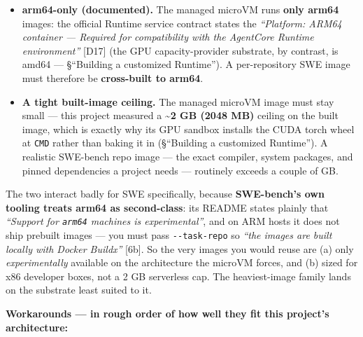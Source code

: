 \documentclass[
  paper=a4,
  ,captions=tableheading
]{scrartcl}
\providecommand{\tightlist}{%
  \setlength{\itemsep}{0pt}\setlength{\parskip}{0pt}}
\begin{document}
\begin{itemize}
\tightlist
\item
  \textbf{arm64-only (documented).} The managed microVM runs
  \textbf{only arm64} images: the official Runtime service contract
  states the \emph{``Platform: ARM64 container --- Required for
  compatibility with the AgentCore Runtime environment''} {[}D17{]} (the
  GPU capacity-provider substrate, by contrast, is amd64 --- §``Building
  a customized Runtime''). A per-repository SWE image must therefore be
  \textbf{cross-built to arm64}.
\item
  \textbf{A tight built-image ceiling.} The managed microVM image must
  stay small --- this project measured a \textbf{\textasciitilde2 GB
  (2048 MB)} ceiling on the built image, which is exactly why its GPU
  sandbox installs the CUDA torch wheel at \texttt{CMD} rather than
  baking it in (§``Building a customized Runtime''). A realistic
  SWE-bench repo image --- the exact compiler, system packages, and
  pinned dependencies a project needs --- routinely exceeds a couple of
  GB.
\end{itemize}

The two interact badly for SWE specifically, because \textbf{SWE-bench's
own tooling treats arm64 as second-class}: its README states plainly
that \emph{``Support for \texttt{arm64} machines is experimental''}, and
on ARM hosts it does not ship prebuilt images --- you must pass
\texttt{-\/-task-repo} so \emph{``the images are built locally with
Docker Buildx''} {[}6b{]}. So the very images you would reuse are (a)
only \emph{experimentally} available on the architecture the microVM
forces, and (b) sized for x86 developer boxes, not a 2 GB serverless
cap. The heaviest-image family lands on the substrate least suited to
it.

\textbf{Workarounds --- in rough order of how well they fit this
project's architecture:}
\end{document}
